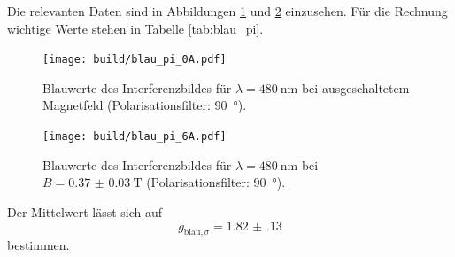 Die relevanten Daten sind in Abbildungen \ref{fig:blau_pi_0A_plot} und \ref{fig:blau_pi_6A_plot} einzusehen.
Für die Rechnung wichtige Werte stehen in Tabelle \ref{tab:blau_pi}.
\begin{figure}[htb]
  \centering
  \texttt{[image: build/blau\_pi\_0A.pdf]}
  \caption{Blauwerte des Interferenzbildes für $\lambda=\SI{480}{\nano\meter}$ bei ausgeschaltetem Magnetfeld (Polarisationsfilter: \SI{90}{\degree}).}
  \label{fig:blau_pi_0A_plot}
\end{figure}
\begin{figure}[htb]
  \centering
  \texttt{[image: build/blau\_pi\_6A.pdf]}
  \caption{Blauwerte des Interferenzbildes für $\lambda=\SI{480}{\nano\meter}$ bei $B=\SI{0.37(3)}{\tesla}$ (Polarisationsfilter: \SI{90}{\degree}).}
  \label{fig:blau_pi_6A_plot}
\end{figure}
Der Mittelwert lässt sich auf
\begin{equation}
  \label{eqn:g_blau_sigma}
  \bar{g}_{\text{blau},\sigma}=\num{1.82(13)}
\end{equation}
bestimmen.


